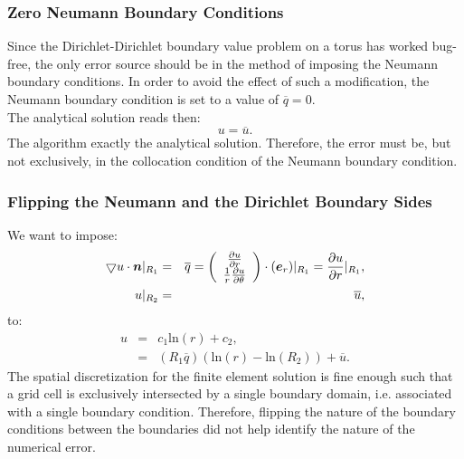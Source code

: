 \documentclass[a4paper,12pt]{article}
\newcommand{\mb}[1]{{\mbox{\boldmath$#1$\unboldmath}}}
\begin{document}
\subsubsection{Zero Neumann Boundary Conditions}
Since the Dirichlet-Dirichlet boundary value problem on a torus has worked bug-free, the only error source should be in the method of imposing the Neumann boundary conditions. In order to avoid the effect of such a modification, the Neumann boundary condition is set to a value of $\overline{q} = 0$. \\
The analytical solution reads then: 
\begin{equation}
u = \overline{u}.
\end{equation}
The algorithm exactly the analytical solution. Therefore, the error must be, but not exclusively, in the collocation condition of the Neumann boundary condition.
\subsubsection{Flipping the Neumann and the Dirichlet Boundary Sides}
We want to impose:
\begin{eqnarray}
\bigtriangledown u \cdot \mb{n}\vert_{R_1} &=& \overline{q} = \left( \begin{array}{c}
 \frac{\partial u}{\partial r} \\
 \frac{1}{r}\frac{\partial u}{\partial\theta} \end{array} \right)\cdot (\mb{e}_r)\vert_{R_1} = \frac{\partial u}{\partial r}\vert_{R_1},\\
u\vert_{R_2} &=& \overline{u},
\end{eqnarray}
to:
\begin{eqnarray}
 u &=& c_1\text{ln}(r) + c_2,\\
  &=& (R_1\overline{q})( \text{ln}(r)- \text{ln}(R_2)) + \overline{u}.
\end{eqnarray}
The spatial discretization for the finite element solution is fine enough such that a grid cell is exclusively intersected by a single boundary domain, i.e. associated with a single boundary condition. Therefore, flipping the nature of the boundary conditions between the boundaries did not help identify the nature of the numerical error. 
\end{document}
